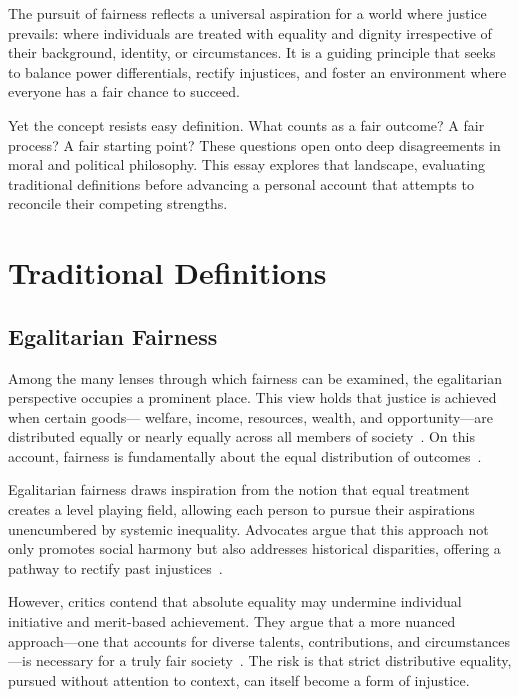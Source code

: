 \documentclass[11pt,showkeys]{../../shared/essay}
\begin{document}
The pursuit of fairness reflects a universal aspiration for a world where justice prevails:
where individuals are treated with equality and dignity irrespective of their background,
identity, or circumstances. It is a guiding principle that seeks to balance power differentials,
rectify injustices, and foster an environment where everyone has a fair chance to succeed.

Yet the concept resists easy definition. What counts as a fair outcome? A fair process? A fair
starting point? These questions open onto deep disagreements in moral and political philosophy.
This essay explores that landscape, evaluating traditional definitions before advancing a
personal account that attempts to reconcile their competing strengths.

\section{Traditional Definitions}

\subsection{Egalitarian Fairness}

Among the many lenses through which fairness can be examined, the egalitarian perspective
occupies a prominent place. This view holds that justice is achieved when certain goods---
welfare, income, resources, wealth, and opportunity---are distributed equally or nearly equally
across all members of society~\cite{temkin2019,afolayan2015}. On this account, fairness is
fundamentally about the equal distribution of outcomes~\cite{eldridge2023,johnson2023}.

Egalitarian fairness draws inspiration from the notion that equal treatment creates a level
playing field, allowing each person to pursue their aspirations unencumbered by systemic
inequality. Advocates argue that this approach not only promotes social harmony but also
addresses historical disparities, offering a pathway to rectify past injustices~\cite{baiasu2020}.

However, critics contend that absolute equality may undermine individual initiative and
merit-based achievement. They argue that a more nuanced approach---one that accounts for
diverse talents, contributions, and circumstances---is necessary for a truly fair
society~\cite{temkin2019}. The risk is that strict distributive equality, pursued without
attention to context, can itself become a form of injustice.
\end{document}
